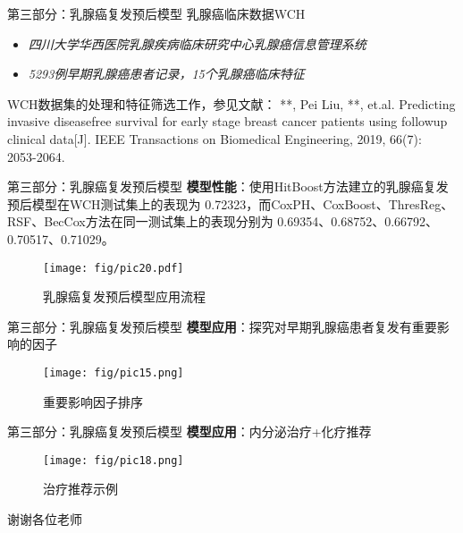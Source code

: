 \documentclass[10pt]{beamer}
\begin{document}
\begin{frame}{第三部分：乳腺癌复发预后模型}
  乳腺癌临床数据WCH
  \begin{itemize}
    \item \textit{四川大学华西医院乳腺疾病临床研究中心乳腺癌信息管理系统}
    \item \textit{5293例早期乳腺癌患者记录，15个乳腺癌临床特征}
  \end{itemize}

  WCH数据集的处理和特征筛选工作，参见文献： **, Pei Liu, **, et.al. Predicting invasive disease­free survival for early stage breast cancer patients using follow­up clinical data[J]. IEEE Transactions on Biomedical Engineering, 2019, 66(7): 2053­-2064.
\end{frame}

\begin{frame}{第三部分：乳腺癌复发预后模型}
  \textbf{模型性能}：使用HitBoost方法建立的乳腺癌复发预后模型在WCH测试集上的表现为 0.72323，而CoxPH、CoxBoost、ThresReg、RSF、BecCox方法在同一测试集上的表现分别为 0.69354、0.68752、0.66792、0.70517、0.71029。

  \begin{figure}[H]
    \centering
    \texttt{[image: fig/pic20.pdf]}
    \caption{乳腺癌复发预后模型应用流程}
  \end{figure}
\end{frame}

\begin{frame}{第三部分：乳腺癌复发预后模型}
  \textbf{模型应用}：探究对早期乳腺癌患者复发有重要影响的因子
  \begin{figure}[H]
    \centering
    \texttt{[image: fig/pic15.png]}
    \caption{重要影响因子排序}
  \end{figure}
\end{frame}

\begin{frame}{第三部分：乳腺癌复发预后模型}
  \textbf{模型应用}：内分泌治疗+化疗推荐
  \begin{figure}[H]
    \centering
    \texttt{[image: fig/pic18.png]}
    \caption{治疗推荐示例}
  \end{figure}
\end{frame}

\begin{frame}[standout]
  谢谢各位老师
\end{frame}
\end{document}
